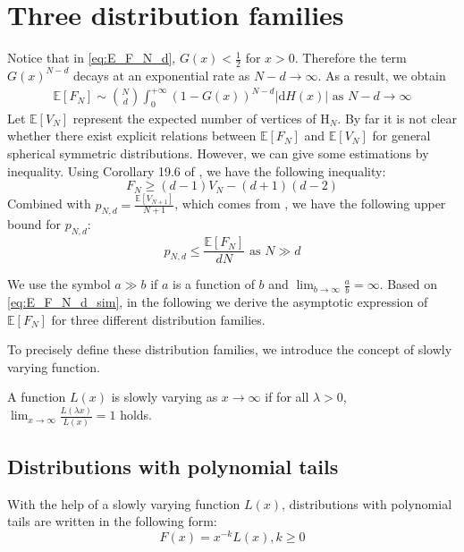 \documentclass{aptpub}
\def\E{\mathbb{E}}
\def\d{\mathrm{d}}
\begin{document}
\section{Three distribution families}\label{sec:three_distriutions}
Notice that in \eqref{eq:E_F_N_d}, $G(x)<\frac{1}{2}$ for $x>0$. Therefore the
term $G(x)^{N-d}$ decays at an exponential rate as $N-d\to \infty$.
As a result, we obtain
\begin{align}
     \E[F_N] \sim \binom{N}{d} \int_0^{+\infty} 
      (1-G(x))^{N-d} |\d H(x)| \textrm{ as } N-d\to \infty
     \label{eq:E_F_N_d_sim}
\end{align}
Let $\E[V_N]$ represent the expected number of
vertices of $\mathrm{H}_N$.
By far it is not clear whether there exist explicit relations
between $\E[F_N]$ and $\E[V_N]$
for general spherical symmetric distributions.
However, we can give some estimations by inequality.
Using Corollary 19.6 of \cite{brondsted2012introduction}, we have the following
inequality:
\begin{equation}\label{eq:F_V_upper}
     F_N \geq (d-1) V_N - (d+1)(d-2)
 \end{equation}
Combined with $p_{N,d} = \frac{\E[V_{N+1}]}{N+1}$, which comes from
\cite{efron1965convex}, we have the following upper bound for $p_{N,d}$:
\begin{equation}\label{eq:p_N_d_bound}
    p_{N,d} \leq \frac{\E[F_N]}{d N} \textrm{ as } N \gg d
\end{equation}

We use the symbol $a \gg b$ if $a$ is a function of $b$ and $\lim_{b\to \infty} \frac{a}{b} = \infty$.
Based on \eqref{eq:E_F_N_d_sim}, in the following
we derive the asymptotic expression of $\E[F_N]$
for three different distribution families.

To precisely define these distribution families, we introduce the concept of slowly varying function.
\begin{definition}
A function $L(x)$ is
slowly varying as $x\to \infty$
if for all $\lambda>0$,
$\lim_{x\to\infty}\frac{L(\lambda x)}{L(x)}=1$
holds.
\end{definition}

\subsection{Distributions with polynomial tails}

With the help of a slowly varying function $L(x)$,
distributions with polynomial tails are written
in the following form:
\begin{equation}\label{eq:F_poly_tail}
     F(x) = x^{-k} L(x), k\geq 0
\end{equation}
\end{document}
